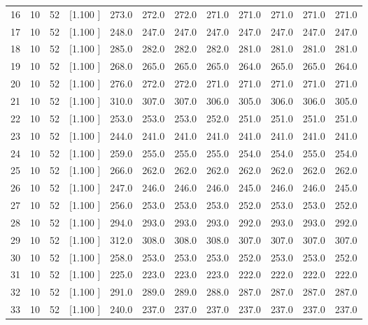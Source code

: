 \documentclass[12pt,a4paper]{article}
\begin{document}
\begin{center}
{\begin{tabular}{r r r r r r r r r r r r}
  16& 10& 52&[1.100     ]&   273.0&   272.0&   272.0&   271.0&   271.0&   271.0&   271.0&   271.0\\[-0.02in]
  17& 10& 52&[1.100     ]&   248.0&   247.0&   247.0&   247.0&   247.0&   247.0&   247.0&   247.0\\[-0.02in]
  18& 10& 52&[1.100     ]&   285.0&   282.0&   282.0&   282.0&   281.0&   281.0&   281.0&   281.0\\[-0.02in]
  19& 10& 52&[1.100     ]&   268.0&   265.0&   265.0&   265.0&   264.0&   265.0&   265.0&   264.0\\[-0.02in]
  20& 10& 52&[1.100     ]&   276.0&   272.0&   272.0&   271.0&   271.0&   271.0&   271.0&   271.0\\[-0.02in]
  21& 10& 52&[1.100     ]&   310.0&   307.0&   307.0&   306.0&   305.0&   306.0&   306.0&   305.0\\[-0.02in]
  22& 10& 52&[1.100     ]&   253.0&   253.0&   253.0&   252.0&   251.0&   251.0&   251.0&   251.0\\[-0.02in]
  23& 10& 52&[1.100     ]&   244.0&   241.0&   241.0&   241.0&   241.0&   241.0&   241.0&   241.0\\[-0.02in]
  24& 10& 52&[1.100     ]&   259.0&   255.0&   255.0&   255.0&   254.0&   254.0&   255.0&   254.0\\[-0.02in]
  25& 10& 52&[1.100     ]&   266.0&   262.0&   262.0&   262.0&   262.0&   262.0&   262.0&   262.0\\[-0.02in]
  26& 10& 52&[1.100     ]&   247.0&   246.0&   246.0&   246.0&   245.0&   246.0&   246.0&   245.0\\[-0.02in]
  27& 10& 52&[1.100     ]&   256.0&   253.0&   253.0&   253.0&   252.0&   253.0&   253.0&   252.0\\[-0.02in]
  28& 10& 52&[1.100     ]&   294.0&   293.0&   293.0&   293.0&   292.0&   293.0&   293.0&   292.0\\[-0.02in]
  29& 10& 52&[1.100     ]&   312.0&   308.0&   308.0&   308.0&   307.0&   307.0&   307.0&   307.0\\[-0.02in]
  30& 10& 52&[1.100     ]&   258.0&   253.0&   253.0&   253.0&   252.0&   253.0&   253.0&   252.0\\[-0.02in]
  31& 10& 52&[1.100     ]&   225.0&   223.0&   223.0&   223.0&   222.0&   222.0&   222.0&   222.0\\[-0.02in]
  32& 10& 52&[1.100     ]&   291.0&   289.0&   289.0&   288.0&   287.0&   287.0&   287.0&   287.0\\[-0.02in]
  33& 10& 52&[1.100     ]&   240.0&   237.0&   237.0&   237.0&   237.0&   237.0&   237.0&   237.0\\[-0.02in]

\end{tabular}}
\end{center}
\end{document}
